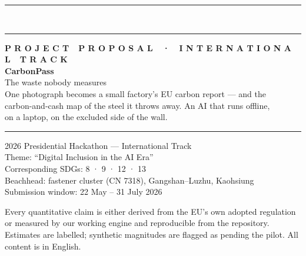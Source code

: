 \documentclass[11pt,a4paper]{article}
\begin{document}
\begin{titlepage}
\noindent
\begin{minipage}{\textwidth}
{\color{ink}\rule{\textwidth}{14mm}}\\[-2.5pt]
{\color{accent}\rule{\textwidth}{2.6mm}}
\end{minipage}
\vspace{2.3cm}
\begin{minipage}{0.9\textwidth}
\hspace{1.8cm}\begin{minipage}{0.9\textwidth}
{\sffamily\footnotesize\bfseries\color{accent}\MakeUppercase{P r o j e c t\ \ P r o p o s a l\ \ ·\ \ I n t e r n a t i o n a l\ \ T r a c k}}\\[8mm]
{\fontsize{31}{35}\selectfont\bfseries\color{ink}CarbonPass}\\[4mm]
{\Large\color{ink!80}The waste nobody measures}\\[6mm]
{\normalsize\color{black!68}One photograph becomes a small factory's EU carbon report --- and the\\carbon-and-cash map of the steel it throws away. An AI that runs offline,\\on a laptop, on the excluded side of the wall.}\\[12mm]
{\color{ink}\rule{2.6pt}{3.1cm}}\hspace{4mm}%
\begin{minipage}[b]{0.82\textwidth}\small
2026 Presidential Hackathon --- International Track\\[1.5pt]
Theme: ``Digital Inclusion in the AI Era''\\[1.5pt]
Corresponding SDGs: 8 · 9 · 12 · 13\\[1.5pt]
Beachhead: fastener cluster (CN 7318), Gangshan--Luzhu, Kaohsiung\\[1.5pt]
Submission window: 22 May -- 31 July 2026
\end{minipage}
\end{minipage}
\end{minipage}
\vfill
\noindent
\begin{minipage}{\textwidth}
\hspace{1.8cm}\begin{minipage}{0.6\textwidth}
\footnotesize\color{black!55}
Every quantitative claim is either derived from the EU's own adopted
regulation or measured by our working engine and reproducible from the
repository. Estimates are labelled; synthetic magnitudes are flagged as
pending the pilot. All content is in English.
\end{minipage}
\hfill
\raisebox{-0.4cm}{{\color{mist}\rule{3cm}{3cm}}}\hspace{-3cm}\raisebox{-3.42cm}{{\color{ink}\rule{6.2cm}{3cm}}}
\end{minipage}
\restoregeometry
\end{titlepage}
\end{document}
